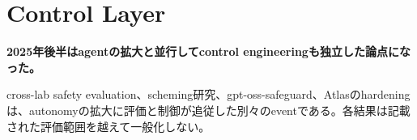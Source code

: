 \section{Control Layer}
\label{pkg:control}
\noindent\textbf{2025年後半はagentの拡大と並行してcontrol engineeringも独立した論点になった。}\autocite{src-ad13fe7d3321}

cross-lab safety evaluation、scheming研究、gpt-oss-safeguard、Atlasのhardeningは、autonomyの拡大に評価と制御が追従した別々のeventである。各結果は記載された評価範囲を越えて一般化しない。\autocite{src-0ad9fbef8c87,src-2081c76ea2b4,src-240a05c02f85,src-3556c47e80db,src-ad13fe7d3321,src-bef6cbe2a83e}

